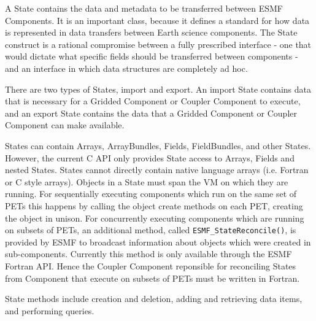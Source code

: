 %



\label{sec:State}

A State contains the data and metadata to be transferred between 
ESMF Components.  It is an important class, because it defines a 
standard for how data is represented in data transfers between Earth
science components.  The 
State construct is a rational compromise between a fully prescribed 
interface - one that would dictate what specific fields should be 
transferred between components - and an interface in which data structures
are completely ad hoc.

There are two types of States, import and export.
An import State contains data that is necessary for a Gridded Component
or Coupler Component to execute, and an export State contains the data
that a Gridded Component or Coupler Component can make available.

States can contain Arrays, ArrayBundles, Fields, FieldBundles, 
and other States. However, the current C API only provides State access to
Arrays, Fields and nested States.
States cannot directly contain native language arrays
(i.e. Fortran or C style arrays).  Objects in a State must span
the VM on which they are running.  For sequentially executing components
which run on the same set of PETs this happens by calling the object
create methods on each PET, creating the object in unison.   For
concurrently executing components which are running on subsets of PETs,
an additional method, called {\tt ESMF\_StateReconcile()}, is provided by
ESMF to broadcast information
about objects which were created in sub-components.
Currently this method is only available through the ESMF Fortran API. Hence
the Coupler Component reponsible for reconciling States from Component that 
execute on subsets of PETs must be written in Fortran.

State methods include creation and deletion, adding and retrieving 
data items, and performing queries.  


